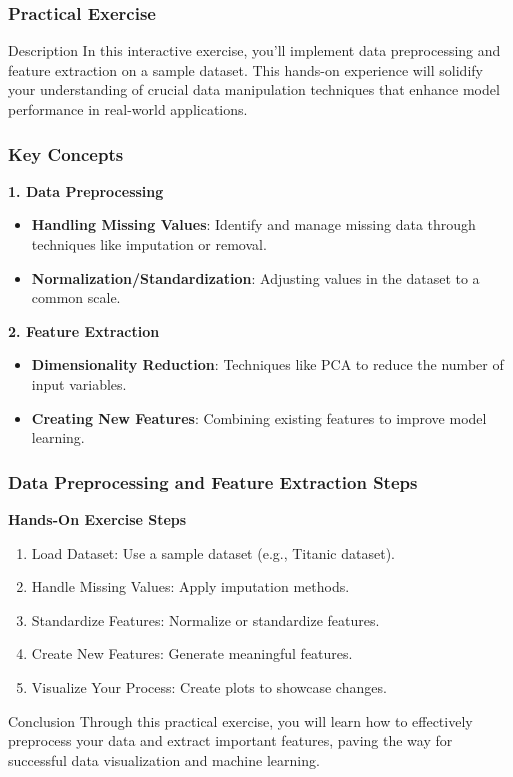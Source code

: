 \documentclass[aspectratio=169]{beamer}
\begin{document}
\begin{frame}[fragile]
    \frametitle{Practical Exercise}
    \begin{block}{Description}
        In this interactive exercise, you'll implement data preprocessing and feature extraction on a sample dataset. This hands-on experience will solidify your understanding of crucial data manipulation techniques that enhance model performance in real-world applications.
    \end{block}
\end{frame}

\begin{frame}[fragile]
    \frametitle{Key Concepts}

    \textbf{1. Data Preprocessing}
    \begin{itemize}
        \item \textbf{Handling Missing Values}: Identify and manage missing data through techniques like imputation or removal.
        \item \textbf{Normalization/Standardization}: Adjusting values in the dataset to a common scale.
    \end{itemize}

    \textbf{2. Feature Extraction}
    \begin{itemize}
        \item \textbf{Dimensionality Reduction}: Techniques like PCA to reduce the number of input variables.
        \item \textbf{Creating New Features}: Combining existing features to improve model learning.
    \end{itemize}
\end{frame}

\begin{frame}[fragile]
    \frametitle{Data Preprocessing and Feature Extraction Steps}
    
    \textbf{Hands-On Exercise Steps}
    \begin{enumerate}
        \item Load Dataset: Use a sample dataset (e.g., Titanic dataset).
        \item Handle Missing Values: Apply imputation methods.
        \item Standardize Features: Normalize or standardize features.
        \item Create New Features: Generate meaningful features.
        \item Visualize Your Process: Create plots to showcase changes.
    \end{enumerate}
    
    \begin{block}{Conclusion}
        Through this practical exercise, you will learn how to effectively preprocess your data and extract important features, paving the way for successful data visualization and machine learning.
    \end{block}
\end{frame}
\end{document}
